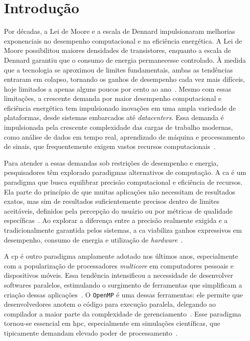 \chapter{Introdução}\label{cap:introducao}

Por décadas, a Lei de Moore e a escala de Dennard impulsionaram melhorias exponenciais no desempenho computacional e na eficiência energética. A Lei de Moore possibilitou maiores densidades de transistores, enquanto a escala de Dennard garantiu que o consumo de energia permanecesse controlado. À medida que a tecnologia se aproximou de limites fundamentais, ambas as tendências entraram em colapso, tornando os ganhos de desempenho cada vez mais difíceis, hoje limitados a apenas alguns poucos por cento ao ano~\cite{hennessy2019}. Mesmo com essas limitações, a crescente demanda por maior desempenho computacional e eficiência energética tem impulsionado inovações em uma ampla variedade de plataformas, desde sistemas embarcados até \textit{datacenters}. Essa demanda é impulsionada pela crescente complexidade das cargas de trabalho modernas, como análise de dados em tempo real, aprendizado de máquina e processamento de sinais, que frequentemente exigem vastos recursos computacionais~\cite{mittal2016, dalloo2024}.

Para atender a essas demandas sob restrições de desempenho e energia, pesquisadores têm explorado paradigmas alternativos de computação. A \gls{ca} é um paradigma que busca equilibrar precisão computacional e eficiência de recursos. Ela parte do princípio de que muitas aplicações não necessitam de resultados exatos, mas sim de resultados suficientemente precisos dentro de limites aceitáveis, definidos pela percepção do usuário ou por métricas de qualidade específicas~\cite{dalloo2024}. Ao explorar a diferença entre a precisão realmente exigida e a tradicionalmente garantida pelos sistemas, a \gls{ca} viabiliza ganhos expressivos em desempenho, consumo de energia e utilização de \textit{hardware}~\cite{xu2016,leon2025a,leon2025b}.

A \gls{cp} é outro paradigma amplamente adotado nos últimos anos, especialmente com a popularização de processadores \textit{multicore} em computadores pessoais e dispositivos móveis. Essa tendência intensificou a necessidade de desenvolver softwares paralelos, estimulando o surgimento de ferramentas que simplificam a criação dessas aplicações~\cite{goncalves2016}. O \texttt{OpenMP} é uma dessas ferramentas: ele permite que desenvolvedores anotem o código para execução paralela, delegando ao compilador a maior parte da complexidade de gerenciamento~\cite{alrawais2021}. Esse paradigma tornou-se essencial em \gls{hpc}, especialmente em simulações científicas, que tipicamente demandam elevado poder de processamento~\cite{adhikari2012}.

